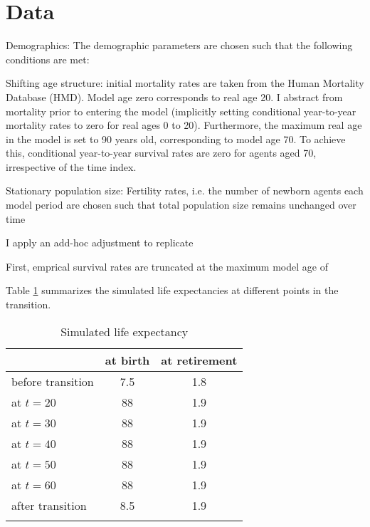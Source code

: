 \section{Data}
\label{sec:data}

Demographics:
The demographic parameters are chosen such that the following conditions are met:


Shifting age structure:
    initial mortality rates are taken from the Human Mortality Database (HMD). Model age zero corresponds to real age 20. I abstract from mortality prior to entering the model (implicitly setting conditional year-to-year mortality rates to zero for real ages 0 to 20). Furthermore, the maximum real age in the model is set to 90 years old, corresponding to model age 70. To achieve this, conditional year-to-year survival rates are zero for agents aged 70, irrespective of the time index.

Stationary population size: Fertility rates, i.e. the number of newborn agents each model period are chosen such that total population size remains unchanged over time


I apply an add-hoc adjustment to replicate

First, emprical survival rates are truncated at the maximum model age of

Table \ref{tab:life_expectancy} summarizes the simulated life expectancies at different points in the transition.

\begin{table}[ht]
    \caption{Simulated life expectancy}
    \label{tab:life_expectancy}
    \centering
    \begin{tabular}{l c c}
        \hline \hline
                            &at birth   & at retirement \\
        \hline
        before transition   &7.5        &1.8 \\
        at $t=20$           &88         &1.9 \\
        at $t=30$           &88         &1.9 \\
        at $t=40$           &88         &1.9 \\
        at $t=50$           &88         &1.9 \\
        at $t=60$           &88         &1.9 \\
        after transition    &8.5        &1.9 \\
        \hline \hline \\
    \end{tabular}
\end{table}
